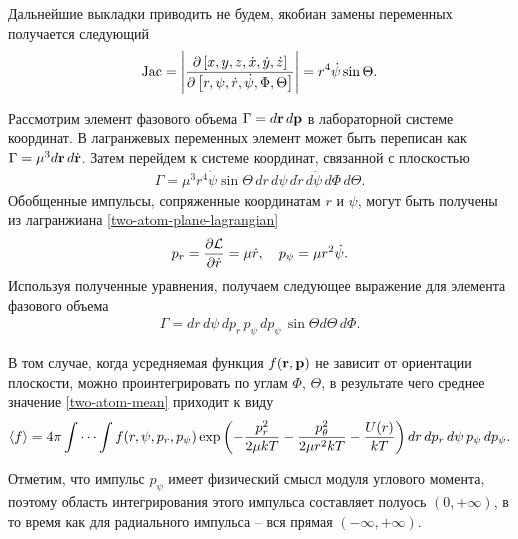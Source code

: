 Дальнейшие выкладки приводить не будем, якобиан замены переменных получается следующий
\begin{gather}
    \text{Jac} = \Bigg\vert \frac{\partial \left[ x, y, z, \dot{x}, \dot{y}, \dot{z} \right]}{\partial \left[ r, \psi, \dot{r}, \dot{\psi}, \Phi, \Theta \right]} \Bigg\vert = r^4 \dot{\psi} \sin \Theta.
\end{gather}

Рассмотрим элемент фазового объема $\Gamma = d\mathbf{r} \, d\mathbf{p}$ в лабораторной системе координат. В лагранжевых переменных элемент может быть переписан как $\Gamma = \mu^3 d\mathbf{r} \, d\dot{\mathbf{r}}$. Затем перейдем к системе координат, связанной с плоскостью 
\begin{gather}
    \Gamma =  \mu^3 r^4 \dot{\psi} \sin \Theta \, dr \, d\psi \, d\dot{r} \, d\dot{\psi} \, d\Phi \, d\Theta. \label{two-atom-phase-space-element}
\end{gather}
Обобщенные импульсы, сопряженные координатам $r$ и $\psi$, могут быть получены из лагранжиана \eqref{two-atom-plane-lagrangian}
\begin{gather}
    p_r = \frac{\partial \mathcal{L}}{\partial \dot{r}} = \mu \dot{r}, \quad p_\psi = \mu r^2 \dot{\psi}.
\end{gather}
Используя полученные уравнения, получаем следующее выражение для элемента фазового объема
\begin{gather}
    \Gamma = dr \, d\psi \, dp_r \, p_\psi \, dp_\psi \, \sin \Theta d\Theta \, d\Phi.
\end{gather}

В том случае, когда усредняемая функция $f(\mathbf{r}, \mathbf{p})$ не зависит от ориентации плоскости, можно проинтегрировать по углам $\Phi$, $\Theta$, в результате чего среднее значение \eqref{two-atom-mean} приходит к виду
\begin{gather}
    \langle f \rangle = 4 \pi \idotsint f(r, \psi, p_r, p_\psi) \exp \left( -\frac{p_r^2}{2\mu k T} - \frac{p_\theta^2}{2 \mu r^2 k T} - \frac{U(r)}{kT} \right) dr \, dp_r \, d\psi \, p_\psi \, dp_\psi. 
\end{gather}

Отметим, что импульс $p_\psi$ имеет физический смысл модуля углового момента, поэтому область интегрирования этого импульса составляет полуось $(0, +\infty)$, в то время как для радиального импульса -- вся прямая $(-\infty, +\infty)$.
